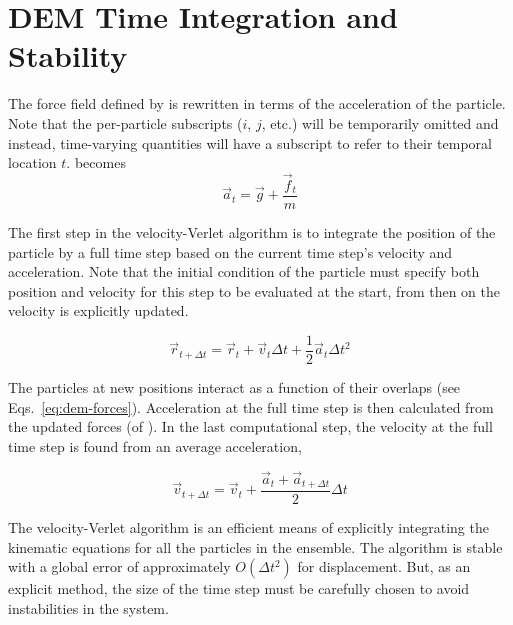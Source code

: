 \chapter{DEM Time Integration and Stability}\label{sec:dem-stability}

The force field defined by  is rewritten in terms of the acceleration of the particle. Note that the per-particle subscripts ($i$, $j$, etc.) will be temporarily omitted and instead, time-varying quantities will have a subscript to refer to their temporal location $t$.  becomes
\begin{equation}\label{eq:newton-acceleration}
	\vec{a}_t = \vec{g} + \frac{\vec{f}_t}{m}
\end{equation}

The first step in the velocity-Verlet algorithm is to integrate the position of the particle by a full time step based on the current time step's velocity and acceleration. Note that the initial condition of the particle must specify both position and velocity for this step to be evaluated at the start, from then on the velocity is explicitly updated.

\begin{equation}
	\vec{r}_{t+\Delta t} = \vec{r}_t + \vec{v}_t\Delta t + \frac{1}{2}\vec{a}_t\Delta t^2
\end{equation}

The particles at new positions interact as a function of their overlaps (see Eqs.~\ref{eq:dem-forces}). Acceleration at the full time step is then calculated from the updated forces (of ). In the last computational step, the velocity at the full time step is found from an average acceleration,

\begin{equation}
	\vec{v}_{t+\Delta t} = \vec{v}_t + \frac{\vec{a}_t + \vec{a}_{t+\Delta t}}{2}\Delta t
\end{equation}

The velocity-Verlet algorithm is an efficient means of explicitly integrating the kinematic equations for all the particles in the ensemble. The algorithm is stable with a global error of approximately $O(\Delta t^2)$ for displacement.\cite{Grubmuller1991} But, as an explicit method, the size of the time step must be carefully chosen to avoid instabilities in the system.



